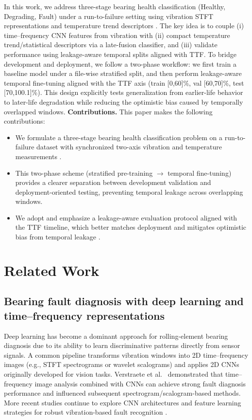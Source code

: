 In this work, we address three-stage bearing health classification (Healthy, Degrading, Fault) under a run-to-failure setting using vibration STFT representations and temperature trend descriptors \cite{jung2024dib_rtf,jung2024mendeley_rtf}. The key idea is to couple (i) time--frequency CNN features from vibration with (ii) compact temperature trend/statistical descriptors via a late-fusion classifier, and (iii) validate performance using leakage-aware temporal splits aligned with TTF.
To bridge development and deployment, we follow a two-phase workflow: we first train a baseline model under a file-wise stratified split, and then perform leakage-aware temporal fine-tuning aligned with the TTF axis (train [0,60]\%, val [60,70]\%, test [70,100.1]\%). This design explicitly tests generalization from earlier-life behavior to later-life degradation while reducing the optimistic bias caused by temporally overlapped windows.
\textbf{Contributions.} This paper makes the following contributions:
\begin{itemize}
    \item We formulate a three-stage bearing health classification problem on a run-to-failure dataset with synchronized two-axis vibration and temperature measurements \cite{jung2024dib_rtf,jung2024mendeley_rtf}.
    \item This two-phase scheme (stratified pre-training $\rightarrow$ temporal fine-tuning) provides a clearer separation between development validation and deployment-oriented testing, preventing temporal leakage across overlapping windows.
    \item We adopt and emphasize a leakage-aware evaluation protocol aligned with the TTF timeline, which better matches deployment and mitigates optimistic bias from temporal leakage \cite{wheat2024leakage,vieira2024realistic}.
\end{itemize}

\section{Related Work}
\label{sec:related_work}

\subsection{Bearing fault diagnosis with deep learning and time--frequency representations}
Deep learning has become a dominant approach for rolling-element bearing diagnosis due to its ability to learn discriminative patterns directly from sensor signals. A common pipeline transforms vibration windows into 2D time--frequency images (e.g., STFT spectrograms or wavelet scalograms) and applies 2D CNNs originally developed for vision tasks. Verstraete et al.~\cite{verstraete2017tf} demonstrated that time--frequency image analysis combined with CNNs can achieve strong fault diagnosis performance and influenced subsequent spectrogram/scalogram-based methods.
More recent studies continue to explore CNN architectures and feature learning strategies for robust vibration-based fault recognition \cite{magar2020faultnet}.

